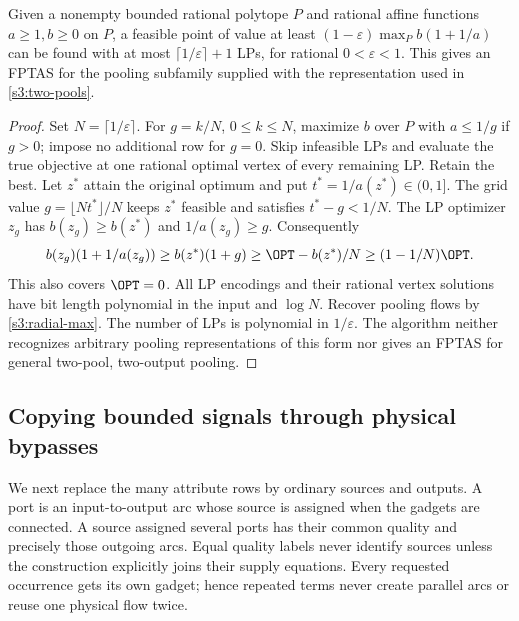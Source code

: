 \begin{proposition}\label{s3:fptas}
Given a nonempty bounded rational polytope $P$ and rational affine
functions $a\ge1,b\ge0$ on $P$, a feasible point of value at least
$(1-\varepsilon)\max_P b(1+1/a)$ can be found with at most
$\lceil1/\varepsilon\rceil+1$ LPs, for rational $0<\varepsilon<1$.
This gives an FPTAS for the pooling subfamily supplied with the
representation used in \cref{s3:two-pools}.
\end{proposition}
\begin{proof}
Set $N=\lceil1/\varepsilon\rceil$. For $g=k/N$, $0\le k\le N$,
maximize $b$ over $P$ with $a\le1/g$ if $g>0$; impose no additional
row for $g=0$. Skip infeasible LPs and evaluate the true objective at
one rational optimal vertex of every remaining LP. Retain the best.
Let $z^*$ attain the original optimum and put $t^*=1/a(z^*)\in(0,1]$.
The grid value $g=\lfloor Nt^*\rfloor/N$ keeps $z^*$ feasible and
satisfies $t^*-g<1/N$. The LP optimizer $z_g$ has $b(z_g)\ge b(z^*)$
and $1/a(z_g)\ge g$. Consequently
\[
 b(z_g)(1+1/a(z_g))\ge b(z^*)(1+g)
 \ge\OPT-b(z^*)/N\ge(1-1/N)\OPT.
\]
This also covers $\OPT=0$. All LP encodings and their rational vertex
solutions have bit length polynomial in the input and $\log N$.
Recover pooling flows by \eqref{s3:radial-max}. The number of LPs is
polynomial in $1/\varepsilon$. The algorithm neither recognizes arbitrary
pooling representations of this form nor gives an FPTAS for general
two-pool, two-output pooling.
\end{proof}

\subsection{Copying bounded signals through physical bypasses}\label{s3:copy}

We next replace the many attribute rows by ordinary sources and outputs.
A port is an input-to-output arc whose source is assigned when the gadgets
are connected. A source assigned several ports has their common quality
and precisely those outgoing arcs. Equal quality labels never identify
sources unless the construction explicitly joins their supply equations.
Every requested occurrence gets its own gadget; hence repeated terms
never create parallel arcs or reuse one physical flow twice.

